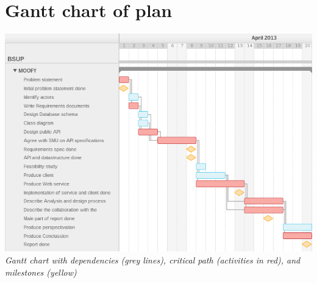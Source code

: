 \section{Gantt chart of plan}
\label{app:gantt}
\includegraphics[scale=0.5]{./Empiri/Planning/img/gantt-chart.png}
\emph{Gantt chart with dependencies (grey lines), critical path (activities
in red), and milestones (yellow)}
